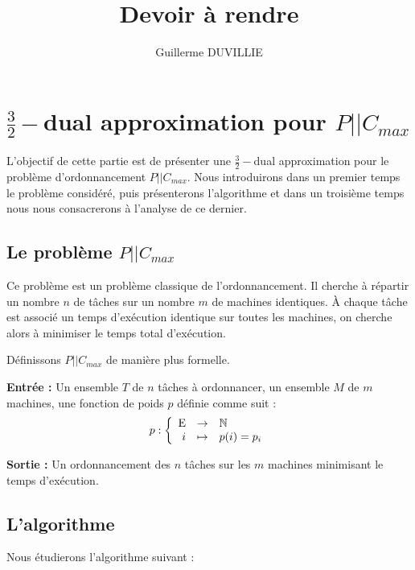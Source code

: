 \documentclass[a4paper,12pt]{thesis}
\author{}
\title{}
\title{Devoir à rendre}
\author{Guillerme DUVILLIE}
\begin{document}
\maketitle

\section*{$\frac{3}{2}-$dual approximation pour $P||C_{max}$}

L'objectif de cette partie est de présenter une $\frac{3}{2}-$dual approximation pour le problème
d'ordonnancement $P||C_{max}$. Nous introduirons dans un premier temps le problème considéré, puis
présenterons l'algorithme et dans un troisième temps nous nous consacrerons à l'analyse de ce
dernier.

\subsection*{Le problème $P||C_{max}$}

Ce problème est un problème classique de l'ordonnancement. Il cherche à répartir un nombre $n$ de
tâches sur un nombre $m$ de machines identiques. À chaque tâche est associé un temps d'exécution
identique sur toutes les machines, on cherche alors à minimiser le temps total d'exécution.

Définissons $P||C_{max}$ de manière plus formelle.

\textbf{Entrée :} Un ensemble $T$ de $n$ tâches à ordonnancer, un ensemble $M$ de $m$ machines, une
fonction de poids $p$ définie comme suit : \begin{displaymath}
    p : \left \{
        \begin{array}{rcl}
            $E$ & \rightarrow & \mathbb{N} \\
            i & \mapsto & p(i) = p_i
    \end{array}
    \right .
\end{displaymath}

\textbf{Sortie :} Un ordonnancement des $n$ tâches sur les $m$ machines minimisant le temps
d'exécution.

\subsection*{L'algorithme}

Nous étudierons l'algorithme suivant :
\end{document}

